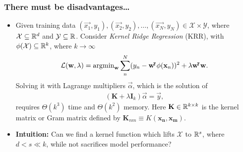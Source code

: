 \documentclass[10pt]{../formats/RU}
\begin{document}
\begin{frame}
  \frametitle{There must be disadvantages\ldots}
  \begin{itemize}
    \item <1-> Given training data $(\vec{x_1}, y_1), (\vec{x_2}, y_2), \ldots, (\vec{x_N}, y_N) \in \mathcal{X}\times\mathcal{Y}$, where $\mathcal{X}\subseteq \mathbb{R}^d$ and $\mathcal{Y}\subseteq\mathbb{R}$. Consider \emph{Kernel Ridge Regression} (KRR), with $\phi(\mathcal{X})\subseteq \mathbb{R}^k$, where $k\rightarrow\infty$
    \begin{align*}
      \mathcal{L}(\mathbf{w}, \lambda)=\operatorname{\mathrm{argmin}}_{\mathbf{w}}\sum_{n}^{N}(y_n - \mathbf{w}{}^{\mkern-4mu\intercal}\phi(\mathbf{x}_n))^2 + \lambda\mathbf{w}{}^{\mkern-4mu\intercal}\mathbf{w}.
    \end{align*}
    Solving it with Lagrange multipliers $\vec{\alpha}$, which is the solution of
    \begin{align*}%
      (\mathbf{K}+\lambda\mathbf{I}_k)\vec{\alpha} = \vec{y},
    \end{align*} 
    requires $\Theta(k^3)$ time and $\Theta(k^2)$ memory. Here $\mathbf{K}\in \mathbb{R}^{k\times k}$ is the kernel matrix or Gram matrix defined by $\mathbf{K}_{nm} \equiv K(\mathbf{x_n}, \mathbf{x_m})$.
    \item <2-> \textbf{Intuition:} Can we find a kernel function which lifts $\mathcal{X}$ to $\mathbb{R}^s$, where $d < s\ll k$, while not sacrifices model performance?
  \end{itemize}
\end{frame}
\end{document}
